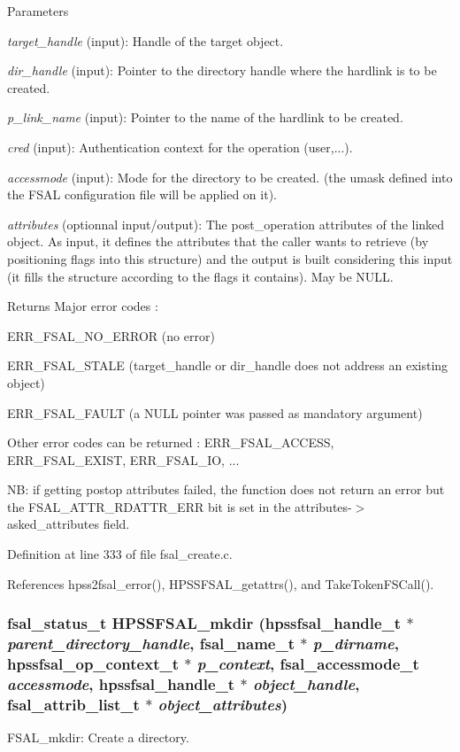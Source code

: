 \begin{DoxyParams}{Parameters}
\item[{\em target\_\-handle}](input): Handle of the target object. \item[{\em dir\_\-handle}](input): Pointer to the directory handle where the hardlink is to be created. \item[{\em p\_\-link\_\-name}](input): Pointer to the name of the hardlink to be created. \item[{\em cred}](input): Authentication context for the operation (user,...). \item[{\em accessmode}](input): Mode for the directory to be created. (the umask defined into the FSAL configuration file will be applied on it). \item[{\em attributes}](optionnal input/output): The post\_\-operation attributes of the linked object. As input, it defines the attributes that the caller wants to retrieve (by positioning flags into this structure) and the output is built considering this input (it fills the structure according to the flags it contains). May be NULL.\end{DoxyParams}
\begin{DoxyReturn}{Returns}
Major error codes :
\begin{DoxyItemize}
\item ERR\_\-FSAL\_\-NO\_\-ERROR (no error)
\item ERR\_\-FSAL\_\-STALE (target\_\-handle or dir\_\-handle does not address an existing object)
\item ERR\_\-FSAL\_\-FAULT (a NULL pointer was passed as mandatory argument)
\item Other error codes can be returned : ERR\_\-FSAL\_\-ACCESS, ERR\_\-FSAL\_\-EXIST, ERR\_\-FSAL\_\-IO, ...
\end{DoxyItemize}
\end{DoxyReturn}
NB: if getting postop attributes failed, the function does not return an error but the FSAL\_\-ATTR\_\-RDATTR\_\-ERR bit is set in the attributes-\/$>$asked\_\-attributes field. 

Definition at line 333 of file fsal\_\-create.c.

References hpss2fsal\_\-error(), HPSSFSAL\_\-getattrs(), and TakeTokenFSCall().
\subsubsection[{HPSSFSAL\_\-mkdir}]{\setlength{\rightskip}{0pt plus 5cm}fsal\_\-status\_\-t HPSSFSAL\_\-mkdir (hpssfsal\_\-handle\_\-t $\ast$ {\em parent\_\-directory\_\-handle}, \/  fsal\_\-name\_\-t $\ast$ {\em p\_\-dirname}, \/  hpssfsal\_\-op\_\-context\_\-t $\ast$ {\em p\_\-context}, \/  fsal\_\-accessmode\_\-t {\em accessmode}, \/  hpssfsal\_\-handle\_\-t $\ast$ {\em object\_\-handle}, \/  fsal\_\-attrib\_\-list\_\-t $\ast$ {\em object\_\-attributes})}\label{fsal__create_8c_a0f3475be9f008cfc43581dd02049bb88}
FSAL\_\-mkdir: Create a directory.


